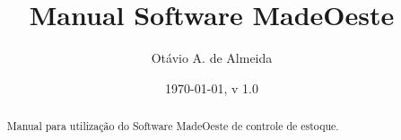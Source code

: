 \documentclass[12pt, a4paper, brazil]{abntex2}
\title{Manual Software MadeOeste}
\author{Otávio A. de Almeida}
\date{\today, v 1.0}
\begin{document}
\maketitle
\begin{abstract}
	\begin{center}
		Manual para utilização do Software MadeOeste de controle de estoque.
	\end{center}
\end{abstract}
\tableofcontents

\listoftables
\end{document}

